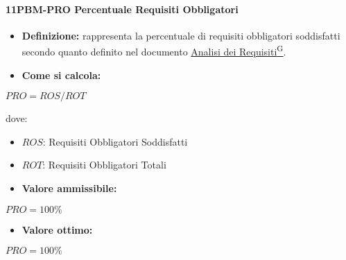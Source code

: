 \paragraph*{11PBM-PRO Percentuale Requisiti Obbligatori}
\begin{itemize}
    \item \textbf{Definizione:} rappresenta la percentuale di requisiti obbligatori soddisfatti secondo quanto definito nel documento \href{https://code7crusaders.github.io/docs/RTB/documentazione_interna/glossario.html#analisi-dei-requisiti}{Analisi dei Requisiti\textsuperscript{G}}.
    \item \textbf{Come si calcola:}
\end{itemize}
\begin{center}
   $PRO = ROS/ROT$ 
\end{center}
dove:
\begin{itemize}[label=$\rightarrow$]
    \item $ROS$: Requisiti Obbligatori Soddisfatti
    \item $ROT$: Requisiti Obbligatori Totali
\end{itemize}
\begin{itemize}
    \item \textbf{Valore ammissibile:}
\end{itemize}
\begin{center}
    $PRO = 100\%$
\end{center}
\begin{itemize}
    \item \textbf{Valore ottimo:}
\end{itemize}
\begin{center}
    $PRO = 100\%$
\end{center}

